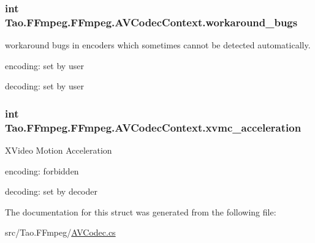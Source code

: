 \label{struct_tao_1_1_f_fmpeg_1_1_f_fmpeg_1_1_a_v_codec_context_a64a5f01f15cc28df8b34f00e5da8e993}
\hypertarget{struct_tao_1_1_f_fmpeg_1_1_f_fmpeg_1_1_a_v_codec_context_a1c5df6d70daaba8f6cc8f63cf9609557}{
\subsubsection[{workaround\_\-bugs}]{\setlength{\rightskip}{0pt plus 5cm}int {\bf Tao.FFmpeg.FFmpeg.AVCodecContext.workaround\_\-bugs}}}
\label{struct_tao_1_1_f_fmpeg_1_1_f_fmpeg_1_1_a_v_codec_context_a1c5df6d70daaba8f6cc8f63cf9609557}
workaround bugs in encoders which sometimes cannot be detected automatically.
\begin{DoxyItemize}
\item encoding: set by user
\item decoding: set by user 
\end{DoxyItemize}\hypertarget{struct_tao_1_1_f_fmpeg_1_1_f_fmpeg_1_1_a_v_codec_context_a1cf89df3590cb99202a3852bc4663fdb}{
\subsubsection[{xvmc\_\-acceleration}]{\setlength{\rightskip}{0pt plus 5cm}int {\bf Tao.FFmpeg.FFmpeg.AVCodecContext.xvmc\_\-acceleration}}}
\label{struct_tao_1_1_f_fmpeg_1_1_f_fmpeg_1_1_a_v_codec_context_a1cf89df3590cb99202a3852bc4663fdb}
XVideo Motion Acceleration
\begin{DoxyItemize}
\item encoding: forbidden
\item decoding: set by decoder 
\end{DoxyItemize}

The documentation for this struct was generated from the following file:\begin{DoxyCompactItemize}
\item 
src/Tao.FFmpeg/\hyperlink{_a_v_codec_8cs}{AVCodec.cs}\end{DoxyCompactItemize}
